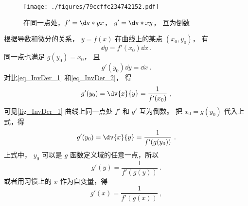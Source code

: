 \begin{figure}[ht]
\centering
\texttt{[image: ./figures/79ccffc234742152.pdf]}
\caption{在同一点处，$f'=\dv*{y}{x}$， $g'=\dv*{x}{y}$， 互为倒数}\label{fig_InvDer_1}
\end{figure}
根据导数和微分的关系， $y = f(x)$ 在曲线上的某点 $(x_0, y_0)$， 有
 \begin{equation}\label{eq_InvDer_1}
\dd{y} = f'(x_0) \dd{x}~.
\end{equation}
同一点也满足 $g(y_0) = x_0$， 且
 \begin{equation}\label{eq_InvDer_2}
g'(y_0)\dd{y} = \dd{x}~.
\end{equation}
对比\autoref{eq_InvDer_1} 和\autoref{eq_InvDer_2}， 得
\begin{equation}
g'(y_0) = \dv{x}{y} = \frac{1}{f'(x_0)}~,
\end{equation}
可见\autoref{fig_InvDer_1} 曲线上同一点处 $f'$ 和 $g'$ 互为倒数。 把 ${x_0} = g(y_0)$ 代入上式，得
\begin{equation}
g'(y_0) = \dv{x}{y} = \frac{1}{f'(g(y_0))}~.
\end{equation} 
上式中， $y_0$ 可以是 $g$ 函数定义域的任意一点，所以
\begin{equation}
g'(y) = \frac{1}{f'(g(y))}~.
\end{equation} 
或者用习惯上的 $x$ 作为自变量，得
\begin{equation}
g'(x) = \frac{1}{f'(g(x))}~,
\end{equation}
